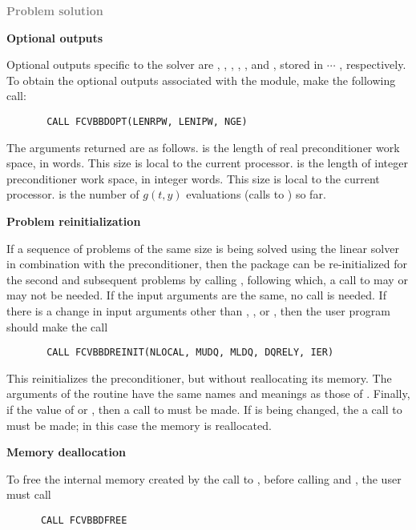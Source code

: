 \begin{Steps}
\item \textcolor{gray}{\bf Problem solution}
  
\item {\bf {\cvbbdpre} Optional outputs}
  
  Optional outputs specific to the {\spgmr} solver are , , , 
  , , and , stored in  $\cdots$ , 
  respectively.
  To obtain the optional outputs associated with the {\cvbbdpre} module, make
  the following call:
\begin{verbatim}
       CALL FCVBBDOPT(LENRPW, LENIPW, NGE)
\end{verbatim}
  The arguments returned are as follows.
   is the length of real preconditioner work space, in  words.
  This size is local to the current processor.
   is the length of integer preconditioner work space, in integer words.
  This size is local to the current processor.
   is the number of $g(t,y)$ evaluations (calls to ) so far.
  
\item {\bf Problem reinitialization}
  
  If a sequence of problems of the same size is being solved using the {\spgmr}
  linear solver in combination with the {\cvbbdpre} preconditioner, then the
  {\cvode} package can be re-initialized for the second and subsequent problems
  by calling , following which, a call to  may or 
  may not be needed.
  If the input arguments are the same, no  call is needed.
  If there is a change in input arguments other than , , or , 
  then the user program should make the call 
\begin{verbatim}
       CALL FCVBBDREINIT(NLOCAL, MUDQ, MLDQ, DQRELY, IER)
\end{verbatim}
  This reinitializes the {\cvbbdpre} preconditioner, but without reallocating its memory.  
  The arguments of the  routine have the same names and meanings as 
  those of .
  Finally, if the value of  or , then a call to  must 
  be made. If  is being changed, the a call to  must
  be made; in this case the {\spgmr} memory is reallocated.
  
\item {\bf Memory deallocation}

  To free the internal memory created by the call to , before calling
   and , the user must call
\begin{verbatim}
      CALL FCVBBDFREE
\end{verbatim}

\end{Steps}
